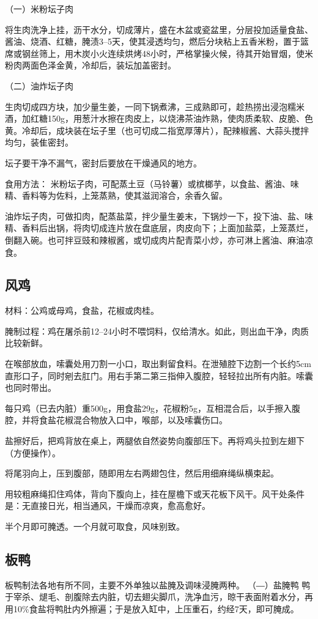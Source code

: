 \documentclass{ctexbook}
\begin{document}
（一）米粉坛子肉

将生肉洗净上挂，沥干水分，切成薄片，盛在木盆或瓷盆里，分层投加适量食盐、酱油、烧酒、红糖，腌渍3--5天，使其浸透均匀，燃后分块粘上五香米粉，置于篮席或钢丝筛上，用木炭小火连续烘烤48小时，严格掌操火候，待其开始冒烟，使米粉肉两面色泽金黄，冷却后，装坛加盖密封。

（二）油炸坛子肉

生肉切成四方块，加少量生姜，一同下锅煮沸，三成熟即可，趁热捞出浸泡糯米酒，加红糖150g，用葱汁水擦在肉皮上，以烧沸茶油炸熟，使肉质柔软、皮脆、色黄。冷却后，成块装在坛子里（也可切成二指宽厚薄片），配辣椒酱、大蒜头搅拌均匀，装隹密封。

坛子要干净不漏气，密封后要放在干燥通风的地方。

食用方法：
米粉坛子肉，可配蒸土豆（马铃薯）或槟榔芋，以食盐、酱油、味精、香料等为佐料，上笼蒸熟，使其滋润溶合，余香久留。

油炸坛子肉，可做扣肉，配蒸盐菜，拌少量生姜末，下锅炒一下，投下油、盐、味精、香料后出锅，将肉切成连片放在盘底层，肉皮向下；上面加盐菜，上笼蒸烂，倒翻入碗。也可拌豆豉和辣椒酱，或切成肉片配青菜小炒，亦可淋上酱油、麻油凉食。
\subsection{风鸡}
材料：公鸡或母鸡，食盐，花椒或肉桂。

腌制过程：鸡在屠杀前12--24小时不喂饲料，仅给清水。如此，则出血干净，肉质比较新鲜。

在喉部放血，嗦囊处用刀割一小口，取出剩留食料。在泄殖腔下边割一个长约5cm直形口子，同时剜去肛门。用右手第二第三指伸入腹腔，轻轻拉出所有内脏。嗦囊也同时带出。

每只鸡（已去内脏）重500g，用食盐29g，花椒粉5g，互相混合后，以手擦入腹腔，并将食盐花椒混合物放入口中，喉部，以及嗦囊伤口。

盐擦好后，把鸡背放在桌上，两腿依自然姿势向腹部压下。再将鸡头拉到左翅下（方便操作）。

将尾羽向上，压到腹部，随即用左右两翅包住，然后用细麻绳纵横束起。

用较粗麻绳扣住鸡体，背向下腹向上，挂在屋檐下或天花板下风干。风干处条件是：无直接日光，相当通风，干燥而凉爽，愈高愈好。

半个月即可腌透。一个月就可取食，风味别致。
\subsection{板鸭}
板鸭制法各地有所不同，主要不外单独以盐腌及调味浸腌两种。
（―）盐腌鸭
鸭于宰杀、煺毛、剖腹除去内脏，切去翅尖脚爪，洗净血污，晾干表面附着水分，再用10\%食盐将鸭肚内外擦遍；于是放入缸中，上压重石，约经7天，即可腌成。
\end{document}
